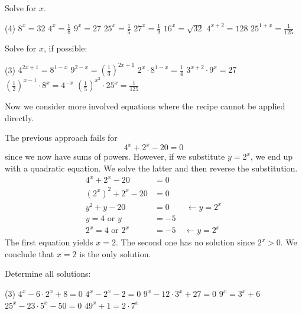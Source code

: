 \begin{exercise}
	Solve for $x$.
	\begin{tasks}(4)
		\task $8^x=32$
		\task $4^x=\frac{1}{8}$
		\task $9^x=27$
		\task $25^x=\frac{1}{5}$
		\task $27^x=\frac{1}{9}$
		\task $16^x=\sqrt{32}$
		\task $4^{x+2}=128$
		\task $25^{1+x}=\frac{1}{125}$
	\end{tasks}
\end{exercise}
\begin{exercise}
	Solve for $x$, if possible:
	\begin{tasks}(3)
		\task $4^{2x+1}=8^{1-x}$
		\task $9^{2-x}=\left(\frac{1}{3}\right)^{2x+1}$
		\task $2^x\cdot 8^{1-x}=\frac{1}{4}$
		\task $3^{x+2}\cdot 9^x=27$
		\task $\left(\frac{1}{2}\right)^{x-1}\cdot 8^x=4^{-x}$
		\task $\left(\frac{1}{5}\right)^{x^2}\cdot 25^x=\frac{1}{125}$
	\end{tasks}
\end{exercise}
Now we consider more involved equations where the recipe cannot be applied directly.
\begin{example}
	The previous approach fails for
	\begin{equation*}
		4^x+2^x-20=0
	\end{equation*}
	since we now have sums of powers. However, if we substitute $y=2^x$, we end up with a quadratic equation. We solve the latter and then reverse the substitution.
	\begin{align*}
		4^x+2^x-20&=0\\
		\left(2^x\right)^2+2^x-20&=0\\
		y^2+y-20&=0\quad\quad\leftarrow y=2^x\\
		y=4\text{ or }y&=-5\\
		2^x=4\text{ or }2^x&=-5\quad\leftarrow y=2^x
	\end{align*}
	The first equation yields $x=2$. The second one has no solution since $2^x>0$.
	We conclude that $x=2$ is the only solution.
\end{example}
\begin{exercise}
	Determine all solutions:
	\begin{tasks}(3)
		\task $4^x-6\cdot 2^x+8=0$
		\task $4^x-2^x-2=0$
		\task $9^x-12\cdot 3^x+27=0$
		\task $9^x=3^x+6$
		\task $25^x-23\cdot 5^x-50=0$
		\task $49^x+1=2\cdot 7^x$
	\end{tasks}
\end{exercise}
